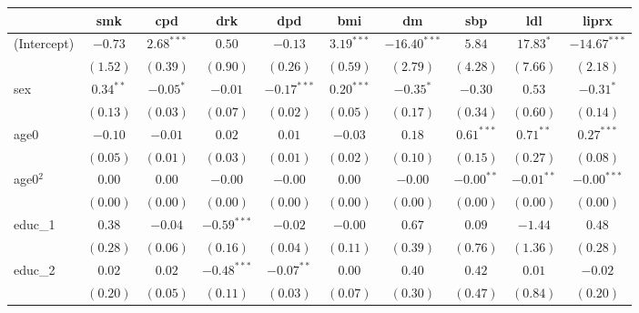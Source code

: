 
\begin{tabular}{l c c c c c c c c c}
\toprule
 & smk & cpd & drk & dpd & bmi & dm & sbp & ldl & liprx \\
\midrule
(Intercept)      & $-0.73$       & $2.68^{***}$  & $0.50$        & $-0.13$       & $3.19^{***}$  & $-16.40^{***}$ & $5.84$        & $17.83^{*}$    & $-14.67^{***}$ \\
                 & $(1.52)$      & $(0.39)$      & $(0.90)$      & $(0.26)$      & $(0.59)$      & $(2.79)$       & $(4.28)$      & $(7.66)$       & $(2.18)$       \\
sex              & $0.34^{**}$   & $-0.05^{*}$   & $-0.01$       & $-0.17^{***}$ & $0.20^{***}$  & $-0.35^{*}$    & $-0.30$       & $0.53$         & $-0.31^{*}$    \\
                 & $(0.13)$      & $(0.03)$      & $(0.07)$      & $(0.02)$      & $(0.05)$      & $(0.17)$       & $(0.34)$      & $(0.60)$       & $(0.14)$       \\
age0             & $-0.10$       & $-0.01$       & $0.02$        & $0.01$        & $-0.03$       & $0.18$         & $0.61^{***}$  & $0.71^{**}$    & $0.27^{***}$   \\
                 & $(0.05)$      & $(0.01)$      & $(0.03)$      & $(0.01)$      & $(0.02)$      & $(0.10)$       & $(0.15)$      & $(0.27)$       & $(0.08)$       \\
age0$^2$         & $0.00$        & $0.00$        & $-0.00$       & $-0.00$       & $0.00$        & $-0.00$        & $-0.00^{**}$  & $-0.01^{**}$   & $-0.00^{***}$  \\
                 & $(0.00)$      & $(0.00)$      & $(0.00)$      & $(0.00)$      & $(0.00)$      & $(0.00)$       & $(0.00)$      & $(0.00)$       & $(0.00)$       \\
educ\_1          & $0.38$        & $-0.04$       & $-0.59^{***}$ & $-0.02$       & $-0.00$       & $0.67$         & $0.09$        & $-1.44$        & $0.48$         \\
                 & $(0.28)$      & $(0.06)$      & $(0.16)$      & $(0.04)$      & $(0.11)$      & $(0.39)$       & $(0.76)$      & $(1.36)$       & $(0.28)$       \\
educ\_2          & $0.02$        & $0.02$        & $-0.48^{***}$ & $-0.07^{**}$  & $0.00$        & $0.40$         & $0.42$        & $0.01$         & $-0.02$        \\
                 & $(0.20)$      & $(0.05)$      & $(0.11)$      & $(0.03)$      & $(0.07)$      & $(0.30)$       & $(0.47)$      & $(0.84)$       & $(0.20)$       \\

\end{tabular}
